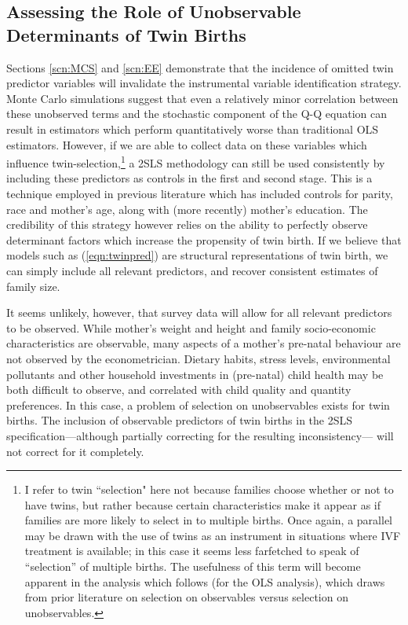 \documentclass{article}[11pt,subeqn]
\begin{document}
\begin{spacing}{1.5}
\subsection{Assessing the Role of Unobservable Determinants of Twin Births}
\label{scn:selection}
Sections \ref{scn:MCS} and \ref{scn:EE} demonstrate that the incidence of omitted twin predictor variables will invalidate the instrumental variable identification strategy.  
Monte Carlo simulations suggest that even a relatively minor correlation between these unobserved terms and the stochastic component of the Q-Q equation can result in estimators 
which perform quantitatively worse than traditional OLS estimators.  However, if we are able to collect data on these variables which influence twin-selection,\footnote{I refer to twin ``selection" 
here not because families choose whether or not to have twins, but rather because certain characteristics make it appear as if families are more likely to select in to multiple 
births.  Once again, a parallel may be drawn with the use of twins as an instrument in situations where IVF treatment is available; in this case it seems less farfetched to speak 
of ``selection'' of multiple births.  The usefulness of this term will become apparent in the analysis which follows (for the OLS analysis), which draws from prior literature on 
selection on observables versus selection on unobservables.} a 2SLS methodology can still be used consistently by including these predictors as controls in the first and second 
stage.  This is a technique employed in previous literature which has included controls for parity, race and mother's age, along with (more recently) mother's education.  The 
credibility of this strategy however relies on the ability to perfectly observe determinant factors which increase the propensity of twin birth.  If we believe that models such 
as (\ref{eqn:twinpred}) are structural representations of twin birth, we can simply include all relevant predictors, and recover consistent estimates of family size.

It seems unlikely, however, that survey data will allow for all relevant predictors to be observed.  While mother's weight and height and family socio-economic characteristics 
are observable, many aspects of a mother's pre-natal behaviour are not observed by the econometrician.  Dietary habits, stress levels, environmental pollutants and other household 
investments in (pre-natal) child health 
may be both difficult to observe, and correlated with child quality and quantity preferences.  In this case, a problem of selection on unobservables exists for twin births.  The 
inclusion of observable predictors of twin births in the 2SLS specification---although partially correcting for the resulting inconsistency--- will not correct for it completely.


\end{spacing}
\end{document}
